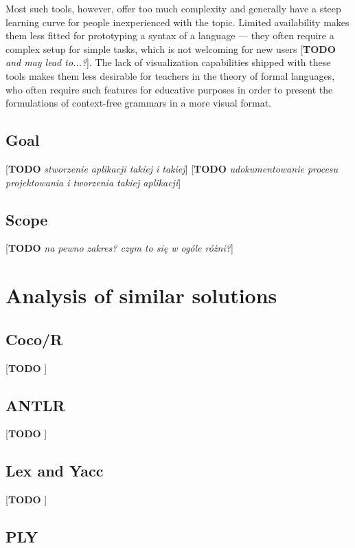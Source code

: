 \documentclass[english,engineering]{wizthesis}
\newcommand{\todo}[1]{{\color{red}[\textbf{TODO} \textit{#1}]}}
\begin{document}
Most such tools, however, offer too much complexity and generally have a steep
learning curve for people inexperienced with the topic. Limited availability
makes them less fitted for prototyping a syntax of a language --- they often
require a complex setup for simple tasks, which is not welcoming for new users
\todo{and may lead to...?}. The lack of visualization capabilities shipped with
these tools makes them less desirable for teachers in the theory of formal
languages, who often require such features for educative purposes in order to
present the formulations of context-free grammars in a more visual format.

\section{Goal}

\todo{stworzenie aplikacji takiej i takiej}
\todo{udokumentowanie procesu projektowania i tworzenia takiej aplikacji}

\section{Scope}

\todo{na pewno zakres? czym to się w ogóle różni?}

\chapter{Analysis of similar solutions}

\section{Coco/R}

\todo{\cite{coco/r}}

\section{ANTLR}

\todo{\cite{antlr}}

\section{Lex and Yacc}

\todo{\cite{lex-yacc}}

\section{PLY}
\end{document}
